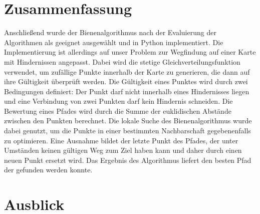 \section{Zusammenfassung}
Anschließend wurde der Bienenalgorithmus nach der Evaluierung der Algorithmen als geeignet ausgewählt und in Python implementiert. 
Die Implementierung ist allerdings auf unser Problem zur Wegfindung auf einer Karte mit Hindernissen angepasst. Dabei wird die stetige Gleichverteilungsfunktion verwendet, um zufällige Punkte innerhalb der Karte zu generieren, die dann auf ihre Gültigkeit überprüft werden. Die Gültigkeit eines Punktes wird durch zwei Bedingungen definiert: Der Punkt darf nicht innerhalb eines Hindernisses liegen und eine Verbindung von zwei Punkten darf kein Hindernis schneiden. Die Bewertung eines Pfades wird durch die Summe der euklidischen Abstände zwischen den Punkten berechnet. Die lokale Suche des Bienenalgorithmus wurde dabei genutzt, um die Punkte in einer bestimmten Nachbarschaft gegebenenfalls zu optimieren. Eine Ausnahme bildet der letzte Punkt des Pfades, der unter Umständen keinen gültigen Weg zum Ziel haben kann und daher durch einen neuen Punkt ersetzt wird. Das Ergebnis des Algorithmus liefert den besten Pfad der gefunden werden konnte. 
\section{Ausblick}